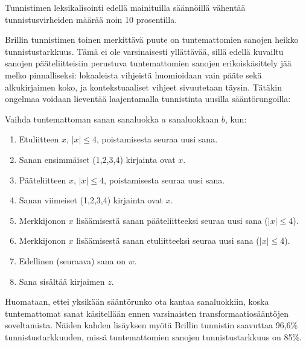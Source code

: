 \documentclass[utf8,bachelor,manualbib]{gradu3}
\begin{document}
Tunnistimen leksikalisointi edellä mainituilla säännöillä vähentää tunnistusvirheiden määrää noin 10 prosentilla. \citep{brill1994}

Brillin tunnistimen toinen merkittävä puute on tuntemattomien sanojen heikko tunnistustarkkuus. Tämä ei ole varsinaisesti yllättävää, sillä edellä kuvailtu sanojen pääteliitteisiin perustuva tuntemattomien sanojen erikoiskäsittely jää melko pinnalliseksi: lokaaleista vihjeistä huomioidaan vain pääte sekä alkukirjaimen koko, ja kontekstuaaliset vihjeet sivuutetaan täysin. Tätäkin ongelmaa voidaan lieventää laajentamalla tunnistinta uusilla sääntörungoilla: 

Vaihda tuntemattoman sanan sanaluokka $a$ sanaluokkaan $b$, kun:
\begin{enumerate}
\item Etuliitteen $x$, $|x| \leq 4$, poistamisesta seuraa uusi sana.
\item Sanan ensimmäiset (1,2,3,4) kirjainta ovat $x$. 
\item Pääteliitteen $x$, $|x| \leq 4$, poistamisesta seuraa uusi sana.
\item Sanan viimeiset (1,2,3,4) kirjainta ovat $x$. 
\item Merkkijonon $x$ lisäämisestä sanan pääteliitteeksi seuraa uusi sana ($|x| \leq 4$).
\item Merkkijonon $x$ lisäämisestä sanan etuliitteeksi seuraa uusi sana ($|x| \leq 4$).
\item Edellinen (seuraava) sana on $w$.
\item Sana sisältää kirjaimen $z$.
\end{enumerate}

Huomataan, ettei yksikään sääntörunko ota kantaa sanaluokkiin, koska tuntemattomat sanat käsitellään ennen varsinaisten transformaatiosääntöjen soveltamista. Näiden kahden lisäyksen myötä Brillin tunnistin saavuttaa 96,6\% tunnistustarkkuuden, missä tuntemattomien sanojen tunnistustarkkuus on 85\%. \citep{brill1994, brill1995}
\end{document}
